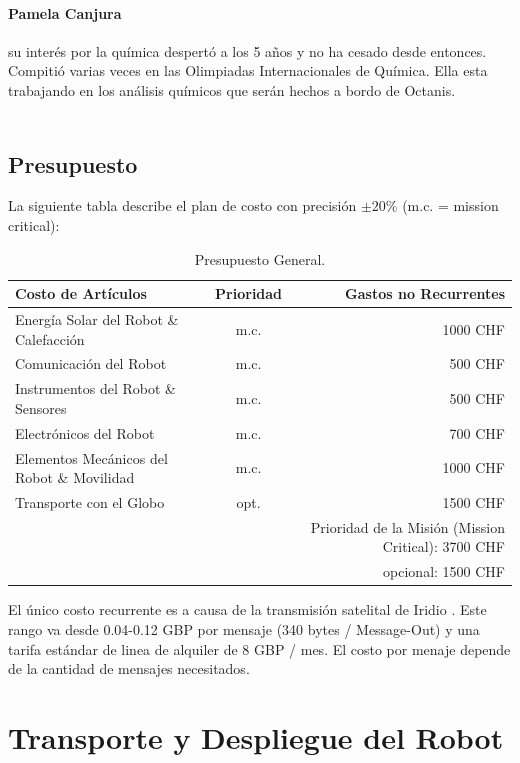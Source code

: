 \documentclass[a4paper,12pt]{article}
\begin{document}
\paragraph{Pamela Canjura}  su interés por la química despertó a los 5 años y no ha cesado desde entonces. Compitió varias veces en las Olimpiadas Internacionales de Química. Ella esta trabajando en los análisis químicos que serán hechos a bordo de Octanis.
\\ \\


\subsection{Presupuesto}

La siguiente tabla describe el plan de costo con precisión $\pm 20\%$ (m.c. = mission critical): \\ 

\begin{table}[h!]
\centering
\begin{tabular}{ l | c || r }
  Costo de Artículos & Prioridad& Gastos no Recurrentes \\
  \hline
  Energía Solar del Robot \& Calefacción & m.c. & 1000 CHF \\
  Comunicación del Robot & m.c. & 500 CHF \\
  Instrumentos del Robot \& Sensores & m.c. & 500 CHF \\
  Electrónicos del Robot & m.c. & 700 CHF \\
  Elementos Mecánicos del Robot \& Movilidad & m.c. & 1000 CHF \\
  Transporte con el Globo & opt. & 1500 CHF \\
  \hline \hline
  & & Prioridad de la Misión (Mission Critical): 3700 CHF  \\
  & & opcional: 1500 CHF \\
\end{tabular}
\caption{Presupuesto General.}
\end{table}


El único costo recurrente es a causa de la transmisión satelital de Iridio \cite{iridium}. Este rango va desde 0.04-0.12 GBP por mensaje (340 bytes / Message-Out) y una tarifa estándar de linea de alquiler de 8 GBP / mes. El costo por menaje depende de la cantidad de mensajes necesitados.



\section{Transporte y Despliegue del Robot}
\end{document}
